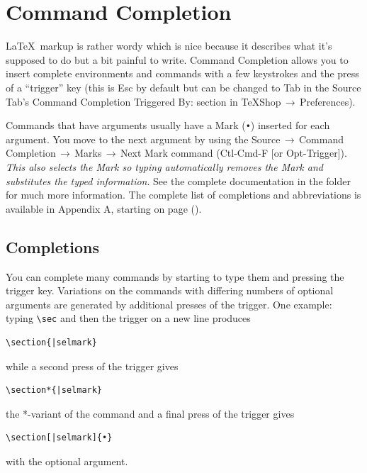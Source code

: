 \documentclass[letterpaper,11pt]{article}
\newcommand{\cmd}[1]{\textsf{#1}}
\newcommand{\mnu}[1]{\textsf{#1}}
\newcommand{\To}{\,\(\to\)\,}
\begin{document}
\section{Command Completion}\label{sec:CC}

\LaTeX\ markup is rather wordy which is nice because it describes what it's supposed to do but a bit painful to write. Command Completion allows you to insert complete environments and commands with a few keystrokes and the press of a ``trigger'' key (this is \cmd{Esc} by default but can be changed to \cmd{Tab} in the \cmd{Source} Tab's \cmd{Command Completion Triggered By:} section in \mnu{TeXShop}\To\mnu{Preferences}). 

Commands that have arguments usually have a Mark (\texttt{•}) inserted for each argument. You move to the next argument by using the \mnu{Source}\To\mnu{Command Completion}\To\mnu{Marks}\To\mnu{Next Mark} command (\cmd{Ctl-Cmd-F} [or \cmd{Opt-Trigger}]). \emph{This also selects the Mark so typing automatically removes the Mark and substitutes the typed information}. See the complete documentation in the  folder for much more information. The complete list of completions and abbreviations is available in \cmd{Appendix A}, starting on page (\pageref{sec:CCTables}).

\subsection{Completions}

You can complete many commands by starting to type them and pressing the trigger key. Variations on the commands with differing numbers of optional arguments are generated by additional presses of the trigger. One example: typing \verb|\sec| and then the trigger on a new line produces
\begin{verbatim}
\section{|selmark}
\end{verbatim}
while a second press of the trigger gives
\begin{verbatim}
\section*{|selmark}
\end{verbatim}
the *-variant of the command and a final press of the trigger gives
\begin{verbatim}
\section[|selmark]{•}
\end{verbatim}
with the optional argument.
\end{document}
